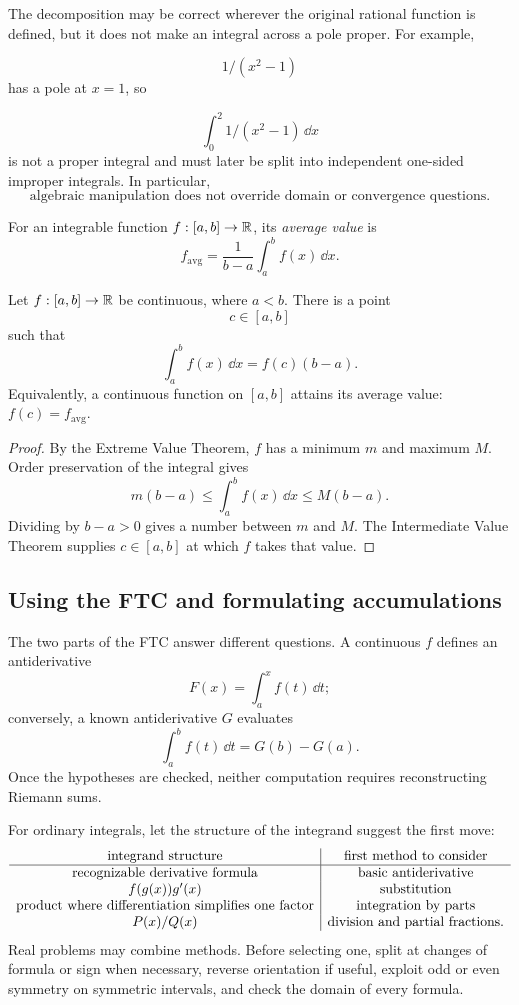 \begin{remark}
The decomposition may be correct wherever the original rational function is
defined, but it does not make an integral across a pole proper. For example,

\[
1/(x^2-1)
\]
 has a pole at \(x=1\), so

\[
\int_0^2 1/(x^2-1)\,\dd x
\]
 is not a proper integral and must later be
split into independent one-sided improper integrals. In particular,
\[
\boxed{\text{algebraic manipulation does not override domain or convergence questions}.}
\]
\end{remark}

\begin{definition}
For an integrable function $f:[a,b]\to\mathbb{R}$, its \emph{average value} is
\[
\boxed{f_{\mathrm{avg}}=\frac1{b-a}\int_a^b f(x)\,\dd x.}
\]
\end{definition}

\begin{theorem}
Let \(f:[a,b]\to\mathbb{R}\) be continuous, where \(a<b\).  There is a point
\[
c\in[a,b]
\]
such that
\[
\int_a^b f(x)\,\dd x=f(c)(b-a).
\]
Equivalently, a continuous function on $[a,b]$ attains its average value:
$f(c)=f_{\mathrm{avg}}$.
\end{theorem}
\begin{proof}
By the Extreme Value Theorem, \(f\) has a minimum \(m\) and maximum \(M\).
Order preservation of the integral gives
\[
m(b-a)
\leq
\int_a^b f(x)\,\dd x
\leq
M(b-a).
\]
Dividing by \(b-a>0\) gives a number between \(m\) and \(M\).  The
Intermediate Value Theorem supplies \(c\in[a,b]\) at which \(f\) takes that
value.
\end{proof}

\subsection{Using the FTC and formulating accumulations}
The two parts of the FTC answer different questions. A continuous $f$
defines an antiderivative
\[
F(x)=\int_a^x f(t)\,\dd t;
\]
conversely, a known antiderivative $G$ evaluates
\[
\int_a^b f(t)\,\dd t=G(b)-G(a).
\]
Once the hypotheses are checked, neither computation requires
reconstructing Riemann sums.

For ordinary integrals, let the structure of the integrand suggest the first
move:
\[
\begin{array}{c|c}
\text{integrand structure}&\text{first method to consider}\cr\hline
\text{recognizable derivative formula}&\text{basic antiderivative}\cr
f(g(x))g'(x)&\text{substitution}\cr
\text{product where differentiation simplifies one factor}
&\text{integration by parts}\cr
P(x)/Q(x)&\text{division and partial fractions}.
\end{array}
\]
Real problems may combine methods. Before selecting one, split at changes of
formula or sign when necessary, reverse orientation if useful, exploit odd or
even symmetry on symmetric intervals, and check the domain of every formula.

